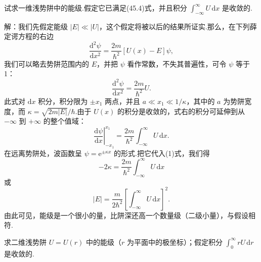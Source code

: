 \begin{xiti}

\quad 试求一维浅势阱中的能级.假定它已满足(45.4)式，并且积分 $\displaystyle\int_{-\infty}^{\infty}U\,\mathrm{d}x$ 是收敛的.

解：我们先假定能级 $|E|\ll|U|$，这个假定将被以后的结果所证实.那么，在下列薛定谔方程的右边
\begin{equation*}
  \frac{\mathrm{d}^2\psi}{\mathrm{d}x^2}=\frac{2m}{\hbar^2}\left[U(x)-E\right]\psi,
\end{equation*}
我们可以略去势阱范围内的 $E$，并把 $\psi$ 看作常数，不失其普遍性，可令 $\psi$ 等于 1：
\begin{equation*}
  \frac{\mathrm{d}^2\psi}{\mathrm{d}x^2}=\frac{2m}{\hbar^2}U.
\end{equation*}
此式对 $\mathrm{d}x$ 积分，积分限为 $\pm x_1$ 两点，并且 $a\ll x_1\ll1/\kappa$，其中的 $a$ 为势阱宽度，而 $\kappa=\sqrt{2m|E|}/\hbar$.由于 $U(x)$ 的积分是收敛的，式右的积分可延伸到从 $-\infty$ 到 $+\infty$ 的整个值域：
\setcounter{equation}{0}\renewcommand{\theequation}{\arabic{equation}}%
\begin{equation}
  \left.\frac{\mathrm{d}\psi}{\mathrm{d}x}\right|_{-x_1}^{x_1}
  =\frac{2m}{\hbar^2}\int_{-\infty}^{\infty}U\,\mathrm{d}x.
\end{equation}
在远离势阱处，波函数呈 $\psi=\mathrm{e}^{\pm\kappa x}$ 的形式.把它代入(1)式，我们得
\begin{equation*}
  -2\kappa=\frac{2m}{\hbar^2}\int_{-\infty}^{\infty}U\,\mathrm{d}x
\end{equation*}
或
\begin{equation*}
  |E|=\frac{m}{2\hbar^2}
  \left[\int_{-\infty}^{\infty}U\,\mathrm{d}x\right]^2.
\end{equation*}
由此可见，能级是一个很小的量，比阱深还高一个数量级（二级小量），与假设相符.

\quad 求二维浅势阱 $U=U(r)$ 中的能级（$r$ 为平面中的极坐标）；假定积分 $\displaystyle\int_0^{\infty}rU\,\mathrm{d}r$ 是收敛的.


\end{xiti}
